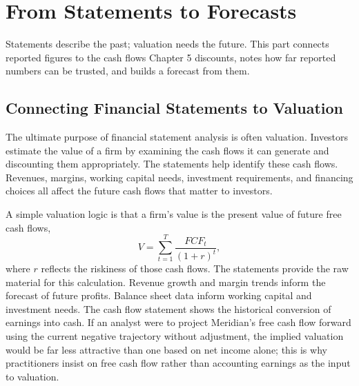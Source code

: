 \documentclass[../ai_in_finance]{subfiles}
\begin{document}
\section{From Statements to Forecasts}

Statements describe the past; valuation needs the future. This part connects reported figures to the cash flows Chapter 5 discounts, notes how far reported numbers can be trusted, and builds a forecast from them.

\subsection{Connecting Financial Statements to Valuation}
\label{sec:valuation-connection}

The ultimate purpose of financial statement analysis is often valuation. Investors estimate the value of a firm by examining the cash flows it can generate and discounting them appropriately. The statements help identify these cash flows. Revenues, margins, working capital needs, investment requirements, and financing choices all affect the future cash flows that matter to investors.

A simple valuation logic is that a firm's value is the present value of future free cash flows,
\begin{equation*}
V = \sum_{t=1}^{T} \frac{FCF_t}{(1+r)^t},
\end{equation*}
where $r$ reflects the riskiness of those cash flows. The statements provide the raw material for this calculation. Revenue growth and margin trends inform the forecast of future profits. Balance sheet data inform working capital and investment needs. The cash flow statement shows the historical conversion of earnings into cash. If an analyst were to project Meridian's free cash flow forward using the current negative trajectory without adjustment, the implied valuation would be far less attractive than one based on net income alone; this is why practitioners insist on free cash flow rather than accounting earnings as the input to valuation.
\end{document}
